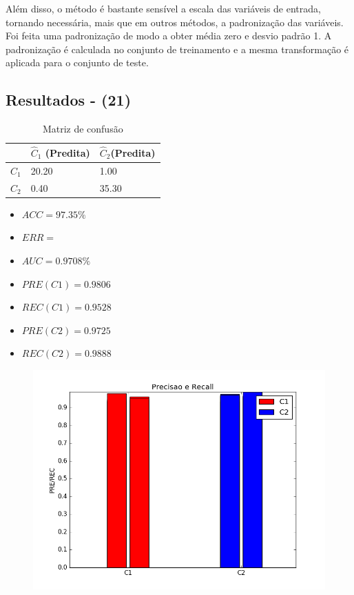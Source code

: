 \documentclass[11pt,a4paper]{article}
\numberwithin{equation}{section}
\begin{document}
Além disso, o método é bastante sensível a escala das variáveis de entrada, tornando necessária, mais que em outros métodos, a padronização das variáveis. Foi feita uma padronização de modo a obter média zero e desvio padrão 1. A padronização é calculada no conjunto de treinamento e a mesma transformação é aplicada para o conjunto de teste.
\subsection{Resultados - (21)}

\begin{table}[H]
\centering
\caption{Matriz de confusão}
\begin{tabular}{l l l}
\hline
 & \textbf{$\hat{C}_1$ (Predita)} & \textbf{$\hat{C}_2$(Predita)}\\
\hline
$C_1$ & 20.20&1.00\\
$C_2$ & 0.40&35.30\\ 
\hline
\end{tabular}
\end{table}

\begin{minipage}{.5\textwidth}
\begin{itemize}
\item $ACC = 97.35 \%$
\item $ERR =  $
\item $AUC = 0.9708 \%$
\item $PRE(C1) = 0.9806$
\item $REC(C1) = 0.9528$
\item $PRE(C2) = 0.9725$
\item $REC(C2) = 0.9888$
\end{itemize}
\end{minipage}%
\begin{minipage}{.5\textwidth}
\begin{figure}[H]
\centering
  \includegraphics[width=\linewidth]{../img/mlp_rec.png}
  \label{fig:percep}
\end{figure}
\end{minipage}%
\end{document}
